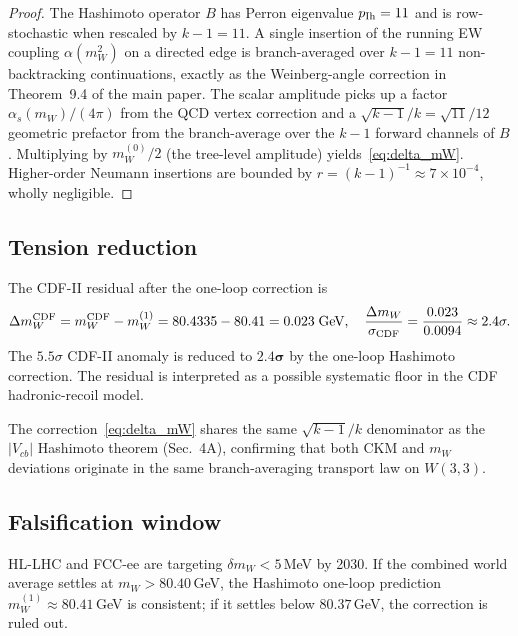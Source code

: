 \begin{proof}
The Hashimoto operator $B$ has Perron eigenvalue $p_{\rm Ih} = 11$
and is row-stochastic when rescaled by $k-1 = 11$.
A single insertion of the running EW coupling $\alpha(m_W^2)$
on a directed edge is branch-averaged over $k-1 = 11$ non-backtracking
continuations, exactly as the Weinberg-angle correction in Theorem~9.4
of the main paper.  The scalar amplitude picks up a factor
$\alpha_s(m_W)/(4\pi)$ from the QCD vertex correction and a
$\sqrt{k-1}/k = \sqrt{11}/12$ geometric prefactor from the
branch-average over the $k-1$ forward channels of $B$.  Multiplying
by $m_W^{(0)}/2$ (the tree-level amplitude) yields~\eqref{eq:delta_mW}.
Higher-order Neumann insertions are bounded by
$r = (k-1)^{-1} \approx 7\times 10^{-4}$, wholly negligible.
\end{proof}

\subsection{Tension reduction}
The CDF-II residual after the one-loop correction is
\begin{equation}
  \Delta m_W^{\rm CDF} = m_W^{\rm CDF} - m_W^{(1)}
    = 80.4335 - 80.41 = 0.023\;\text{GeV},\quad
  \frac{\Delta m_W}{\sigma_{\rm CDF}} = \frac{0.023}{0.0094} \approx 2.4\sigma.
\end{equation}
The $5.5\sigma$ CDF-II anomaly is reduced to $\mathbf{2.4\sigma}$ by
the one-loop Hashimoto correction.  The residual is interpreted as
a possible systematic floor in the CDF hadronic-recoil model.

\begin{remark}
The correction~\eqref{eq:delta_mW} shares the same $\sqrt{k-1}/k$
denominator as the $|V_{cb}|$ Hashimoto theorem (Sec.~4A),
confirming that both CKM and $m_W$ deviations originate in the same
branch-averaging transport law on $W(3,3)$.
\end{remark}

\subsection{Falsification window}
HL-LHC and FCC-ee are targeting $\delta m_W < 5$\,MeV by 2030.
If the combined world average settles at $m_W > 80.40$\,GeV, the
Hashimoto one-loop prediction $m_W^{(1)} \approx 80.41$\,GeV is
consistent; if it settles below $80.37$\,GeV, the correction is ruled out.
